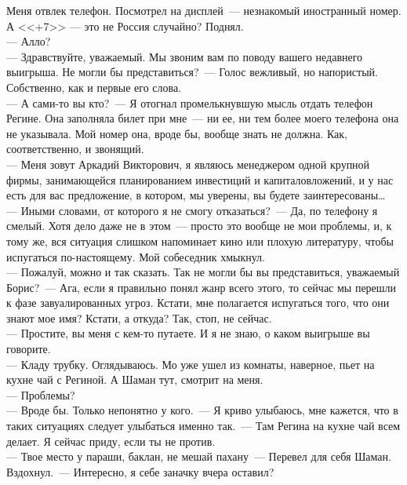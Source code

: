 Меня отвлек телефон. Посмотрел на дисплей~--- незнакомый иностранный номер. А 
<<+7>> --- это не Россия случайно? Поднял.\\
--- Алло?\\
--- Здравствуйте, уважаемый. Мы звоним вам по поводу вашего недавнего выигрыша. 
Не могли бы представиться?~--- Голос вежливый, но напористый. Собственно, как и 
первые его слова.\\
--- А сами-то вы кто?~--- Я отогнал промелькнувшую мысль отдать телефон Регине. 
Она заполняла билет при мне~--- ни ее, ни тем более моего телефона она не 
указывала. Мой номер она, вроде бы, вообще знать не должна. Как, соответственно, и 
звонящий.\\
--- Меня зовут Аркадий Викторович, я являюсь менеджером одной крупной фирмы, 
занимающейся планированием инвестиций и капиталовложений, и у нас есть для вас 
предложение, в котором, мы уверены, вы будете заинтересованы\ldots\\
--- Иными словами, от которого я не смогу отказаться?~--- Да, по телефону я 
смелый. Хотя дело даже не в этом~--- просто это вообще не мои проблемы, и, к тому же, 
вся ситуация слишком напоминает кино или плохую литературу, чтобы испугаться 
по-настоящему. Мой собеседник хмыкнул.\\
--- Пожалуй, можно и так сказать. Так не могли бы вы представиться, уважаемый 
Борис?~--- Ага, если я правильно понял жанр всего этого, то сейчас мы перешли к 
фазе завуалированных угроз. Кстати, мне полагается испугаться того, что они 
знают мое имя? Кстати, а откуда? Так, стоп, не сейчас.\\
--- Простите, вы меня с кем-то путаете. И я не знаю, о каком выигрыше вы 
говорите. \\
--- Кладу трубку. Оглядываюсь. Мо уже ушел из комнаты, наверное, пьет на кухне 
чай с Региной. А Шаман тут, смотрит на меня.\\
--- Проблемы?\\
--- Вроде бы. Только непонятно у кого.~--- Я криво улыбаюсь, мне кажется, что в 
таких ситуациях следует улыбаться именно так.~--- Там Регина на кухне чай всем 
делает. Я сейчас приду, если ты не против.\\
--- Твое место у параши, баклан, не мешай пахану~--- Перевел для себя Шаман. 
Вздохнул.~--- Интересно, я себе заначку вчера оставил?

